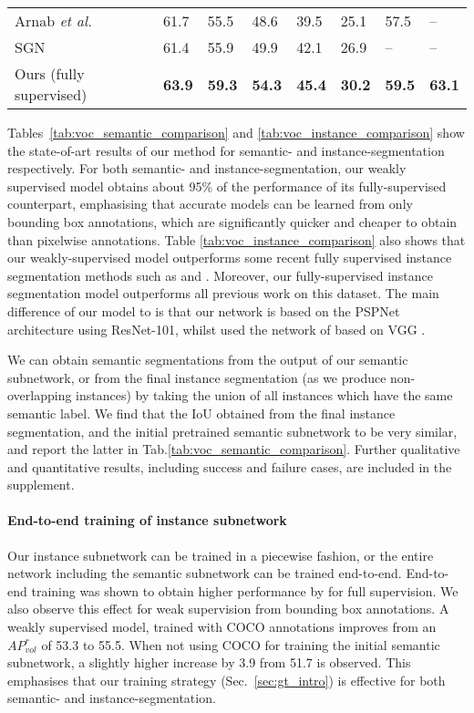 \documentclass[runningheads]{llncs}
\def\etal{\emph{et al.} }
\begin{document}
\begin{table}[t]
\begin{tabularx}{0.9\linewidth}{lYYYYYYY}
Arnab \etal \cite{arnab_cvpr_2017} & 61.7 & 55.5 & 48.6 & 39.5 & 25.1 & 57.5 & --\\
SGN \cite{liu_iccv_2017} & 61.4 & 55.9 & 49.9 & 42.1 & 26.9 & -- & --\\
Ours (fully supervised) & \textbf{63.9} & \textbf{59.3} & \textbf{54.3} & \textbf{45.4} & \textbf{30.2} & \textbf{59.5} & \textbf{63.1}\\
\bottomrule                                 
\end{tabularx}
\end{table} Tables~\ref{tab:voc_semantic_comparison} and \ref{tab:voc_instance_comparison} show the state-of-art results of our method for semantic- and instance-segmentation respectively.
For both semantic- and instance-segmentation, our weakly supervised model obtains about 95\% of the performance of its fully-supervised counterpart, emphasising that accurate models can be learned from only bounding box annotations, which are significantly quicker and cheaper to obtain than pixelwise annotations.
Table \ref{tab:voc_instance_comparison} also shows that our weakly-supervised model outperforms some recent fully supervised instance segmentation methods such as \cite{arnab_bmvc_2016} and \cite{liang_arxiv_2015}.
Moreover, our fully-supervised instance segmentation model outperforms all previous work on this dataset.
The main difference of our model to \cite{arnab_cvpr_2017} is that our network is based on the PSPNet architecture using ResNet-101, whilst \cite{arnab_cvpr_2017} used the network of \cite{arnab_eccv_2016} based on VGG \cite{simonyan_iclr_2015}.

We can obtain semantic segmentations from the output of our semantic subnetwork, or from the final instance segmentation (as we produce non-overlapping instances) by taking the union of all instances which have the same semantic label.
We find that the IoU obtained from the final instance segmentation, and the initial pretrained semantic subnetwork to be very similar, and report the latter in Tab.\ref{tab:voc_semantic_comparison}.
Further qualitative and quantitative results, including success and failure cases, are included in the supplement.

\paragraph{End-to-end training of instance subnetwork}
Our instance subnetwork can be trained in a piecewise fashion, or the entire network including the semantic subnetwork can be trained end-to-end.
End-to-end training was shown to obtain higher performance by \cite{arnab_cvpr_2017} for full supervision.
We also observe this effect for weak supervision from bounding box annotations.
A weakly supervised model, trained with COCO annotations improves from an $AP^{r}_{vol}$ of 53.3 to 55.5.
When not using COCO for training the initial semantic subnetwork, a slightly higher increase by 3.9 from 51.7 is observed.
This emphasises that our training strategy (Sec.~\ref{sec:gt_intro}) is effective for both semantic- and instance-segmentation.
\end{document}
